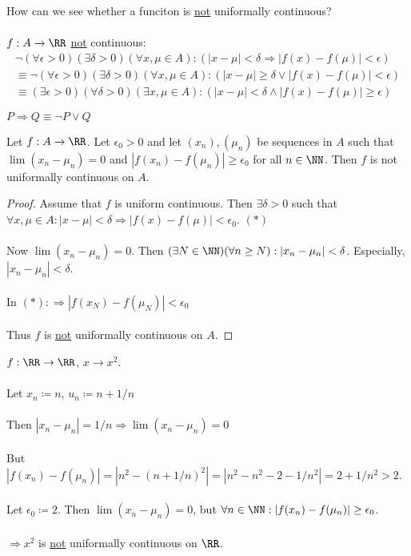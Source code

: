 \documentclass[class=scrartcl, crop=false]{standalone}
\begin{document}
How can we see whether a funciton is \ul{not} uniformally continuous?
\\\\
$f: A \to \RR$ \ul{not} continuous:
\begin{gather*}
  \neg (\forall \epsilon > 0)(\exists \delta > 0) (\forall x, \mu \in A) : (|x - \mu| < \delta \Rightarrow |f(x) - f(\mu)| < \epsilon)
  \\
  \equiv \neg(\forall \epsilon > 0)(\exists \delta > 0)(\forall x, \mu \in A) : (|x - \mu| \geq \delta \vee |f(x) - f(\mu)| < \epsilon)
  \\
  \equiv
  (\exists \epsilon > 0)(\forall \delta > 0) (\exists x, \mu \in A) : (|x - \mu| < \delta \wedge |f(x) - f(\mu)| \geq \epsilon)
\end{gather*} 
\begin{recall}
  $P \Rightarrow Q \equiv \neg P \vee Q$
\end{recall} 

\begin{theorem}
  Let $f : A \to \RR$. Let $\epsilon_0 > 0$ and let $(x_n), (\mu_n)$ be sequences in $A$ such that $\lim(x_n - \mu_n) = 0$ and $|f(x_n) - f(\mu_n)| \geq \epsilon_0$ for all $n \in \NN$. Then $f$ is not uniformally continuous on $A$.
  \begin{proof}
    Assume that $f$ is uniform continuous. Then $\exists \delta > 0$ such that $\forall x, \mu \in A : |x - \mu| < \delta \Rightarrow |f(x) - f(\mu)| < \epsilon_0$. $(*)$
    \\\\
    Now $\lim(x_n - \mu_n) = 0$. Then $(\exists N \in \NN) (\forall n \geq N): |x_n - \mu_n| < \delta$. Especially, $|x_n - \mu_n| < \delta$.
    \\\\
    In $(*) : \Rightarrow|f(x_N) - f(\mu_N)| < \epsilon_0$ \lightning
    \\\\
  Thus $f$ is \ul{not} uniformally continuous on $A$.
  \end{proof} 
\end{theorem} 

\begin{example}
  $f : \RR \to \RR$, $x \to x^2$.
  \\\\
  Let $x_n \coloneqq n$, $u_n \coloneqq n + 1 / n$ 
  \\\\
  Then $|x_n - \mu_n| = 1 / n \Rightarrow \lim(x_n - \mu_n) = 0$
  \\\\
  But $|f(x_n) - f(\mu_n)| = |n^2 - (n + 1 / n)^2| = |n^2 - n^2 - 2 - 1 / n^2| = 2 + 1 / n^2 > 2$.
  \\\\
  Let $\epsilon_0 \coloneqq 2$. Then $\lim(x_n - \mu_n) = 0$, but $\forall n \in \NN : |f(x_n) - f(\mu_n)| \geq \epsilon_0$.
  \\\\
  $\Rightarrow x^2$ is \ul{not} uniformally continuous on $\RR$.
\end{example} 
\end{document}
